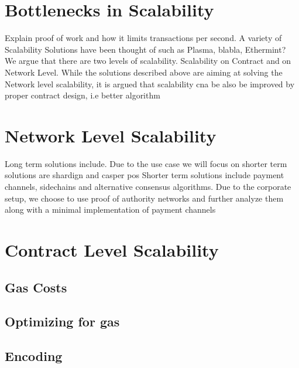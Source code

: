 \section{Bottlenecks in Scalability}
Explain proof of work and how it limits transactions per second.
A variety of Scalability Solutions have been thought of such as Plasma, blabla, Ethermint?
We argue that there are two levels of scalability. Scalability on Contract and on Network Level. While the solutions described above are aiming at solving the Network level scalability, it is argued that scalability cna be also be improved by proper contract design, i.e better algorithm

\section{Network Level Scalability}
Long term solutions include. Due to the use case we will focus on shorter term solutions are shardign and casper pos
Shorter term solutions include payment channels, sidechains and alternative consensus algorithms. Due to the corporate setup, we choose to use proof of authority networks and further analyze them along with a minimal implementation of payment channels

\section{Contract Level Scalability}
\subsection{Gas Costs}
\subsection{Optimizing for gas}
\subsection{Encoding}